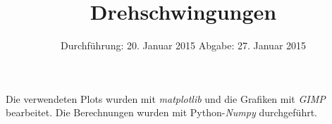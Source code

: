
\usepackage{marvosym}
\subject{Anfängerpraktikum V102}
\title{Drehschwingungen
}
\date{
  Durchführung: 20. Januar 2015
  \hspace{1em}
  Abgabe: 27. Januar 2015
}


\maketitle
\thispagestyle{empty}
\newpage





\printbibliography
\noindent Die verwendeten Plots wurden mit \textit{matplotlib}\cite{matplotlib} und die Grafiken mit \textit{GIMP}\cite{gimp} bearbeitet.
Die Berechnungen wurden mit Python-\textit{Numpy}\cite{numpy} durchgeführt.

